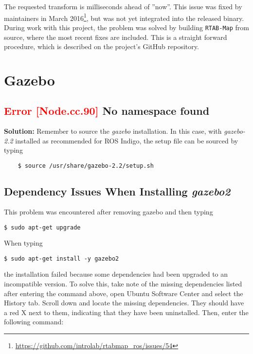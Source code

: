 The requested transform is milliseconds ahead of ''now''. This issue was fixed by maintainers in March 2016\footnote{\url{https://github.com/introlab/rtabmap_ros/issues/54}}, but was not yet integrated into the released binary. During work with this project, the problem was solved by building \texttt{RTAB-Map} from source, where the most recent fixes are included. This is a straight forward procedure, which is described on the project's GitHub repository. 

\section{Gazebo}

\subsection{\textcolor{red}{Error [Node.cc.90]} No namespace found}

\textbf{Solution: } Remember to source the \textit{gazebo} installation. In this case, with \textit{gazebo-2.2} installed as recommended for \ac{ROS} Indigo, the setup file can be sourced by typing

\begin{verbatim}
	$ source /usr/share/gazebo-2.2/setup.sh
\end{verbatim}

\subsection{Dependency Issues When Installing \textit{gazebo2}}

This problem was encountered after removing gazebo and then typing

\begin{verbatim}
$ sudo apt-get upgrade
\end{verbatim}

When typing 

\begin{verbatim}
$ sudo apt-get install -y gazebo2
\end{verbatim}

the installation failed because some dependencies had been upgraded to an incompatible version. To solve this, take note of the missing dependencies listed after entering the command above, open Ubuntu Software Center and select the History tab. Scroll down and locate the missing dependencies. They should have a red X next to them, indicating that they have been uninstalled. Then, enter the following command:


